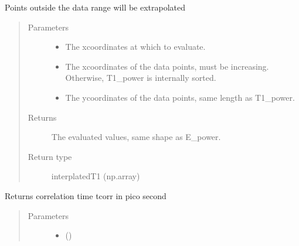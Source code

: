 \documentclass[letterpaper,10pt,english]{sphinxmanual}
\begin{document}
\begin{fulllineitems}
\begin{fulllineitems}
Points outside the data range will be extrapolated
\begin{quote}\begin{description}
\item[{Parameters}] \leavevmode\begin{itemize}
\item {} 
 \sphinxhyphen{}\sphinxhyphen{} The x\sphinxhyphen{}coordinates at which to evaluate.

\item {} 
 \sphinxhyphen{}\sphinxhyphen{} The x\sphinxhyphen{}coordinates of the data points, must be increasing.
Otherwise, T1\_power is internally sorted.

\item {} 
 \sphinxhyphen{}\sphinxhyphen{} The y\sphinxhyphen{}coordinates of the data points, same length as T1\_power.

\end{itemize}

\item[{Returns}] \leavevmode
The evaluated values, same shape as E\_power.

\item[{Return type}] \leavevmode
interplatedT1 (np.array)

\end{description}\end{quote}

\end{fulllineitems}


\begin{fulllineitems}
\label{\detokenize{dnpHydration:dnpLab.dnpHydration.HydrationCalculator.get_tcorr}}
Returns correlation time tcorr in pico second
\begin{quote}\begin{description}
\item[{Parameters}] \leavevmode\begin{itemize}
\item {} 
 () \sphinxhyphen{}\sphinxhyphen{} 


\end{itemize}
\end{description}
\end{quote}
\end{fulllineitems}
\end{fulllineitems}
\end{document}
